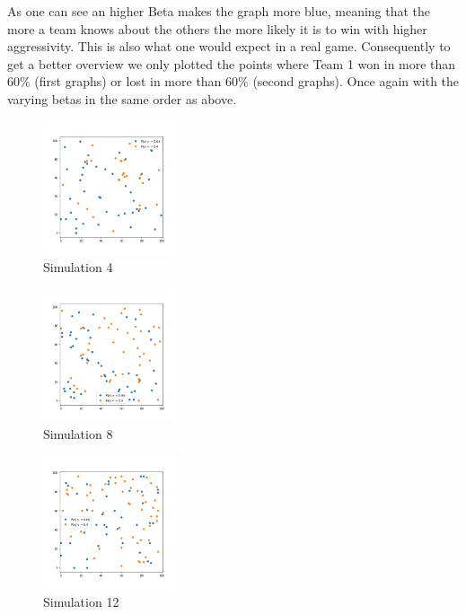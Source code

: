 As one can see an higher Beta makes the graph more blue, meaning that the more a team knows about the others the more likely it is to win with higher aggressivity. This is also what one would expect in a real game.
Consequently to get a better overview we only plotted the points where Team 1 won in more than 60$\%$ (first graphs) or lost in more than 60$\%$ (second graphs). Once again with the varying betas in the same order as above.

\begin{figure}[!ht]
    \centering
    \includegraphics[width=0.35\textwidth]{Bilder/simulation_2_3}
    \caption{Simulation 4}
    \label{fig:meine-grafik}
    \end{figure}
\begin{figure}[!ht]
    \centering
    \includegraphics[width=0.35\textwidth]{Bilder/simulation_3_3}
    \caption{Simulation 8}
    \label{fig:meine-grafik}
    \end{figure}
\begin{figure}[!ht]
    \centering
    \includegraphics[width=0.35\textwidth]{Bilder/simulation_4_3}
    \caption{Simulation 12}
    \label{fig:meine-grafik}
\end{figure}


